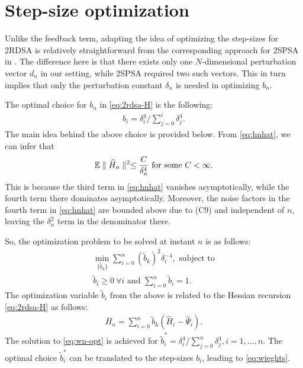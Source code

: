\section{Step-size optimization}
Unlike the feedback term, adapting the idea of optimizing the step-sizes for 2RDSA is relatively straightforward from the corresponding approach for 2SPSA in \cite{spall-jacobian}. The difference here is that there exists only one $N$-dimensional perturbation vector $d_n$ in our setting, while 2SPSA required two such vectors. This in turn implies that only the perturbation constant $\delta_n$ is needed in optimizing $b_n$.

The optimal choice for $b_n$ in \eqref{eq:2rdsa-H} is the following:
\begin{align}
\label{eq:wieghts}
b_i  = \delta_i^{4}/\sum\limits_{j=0}^{i} \delta_j^{4}.
\end{align}
The main idea behind the above choice is provided below.
From \eqref{eq:hnhat}, we can infer that
\begin{align*}
\mathbb{E} \parallel \widehat H_n \parallel^2 \le \dfrac{C}{\delta_n^4} \text{ for some } C<\infty. 
\end{align*} 
This is because the third term in \eqref{eq:hnhat} vanishes asymptotically, while the fourth term there dominates asymptotically. Moreover, the noise factors in the fourth term in \eqref{eq:hnhat} are bounded above due to (C9) and independent of $n$, leaving the $\delta_n^2$ term in the denominator there. 

So, the optimization problem to be solved at instant $n$ is as follows:
\begin{align}
\min_{ \{\tilde b_k\} } \sum \limits_{i=0}^{n} (\tilde b_k)^2 \delta_i^{-4}, \text{ subject to} \label{eq:wn-opt}\\
\tilde b_i \geq 0 ~\forall i \text{ and }\sum \limits_{i=0}^{n} \tilde b_i = 1.
\end{align}
The optimization variable $\tilde b_i$ from the above is related to the Hessian recursion \eqref{eq:2rdsa-H} as follows:
\begin{align}
\label{eq:hess}
\overline H_n = \sum\limits_{i=0}^{n} \tilde b_k(\widehat H_i -\widehat \Psi_i).
\end{align}
The solution to \eqref{eq:wn-opt} is achieved for $\tilde b_i^* = \delta_i^{4}/\sum \limits_{j=0}^{n} \delta_j^{4}, i=1,\ldots,n$. The optimal choice $\tilde b_i^*$ can be translated to the step-sizes $b_i$, leading to \eqref{eq:wieghts}.

